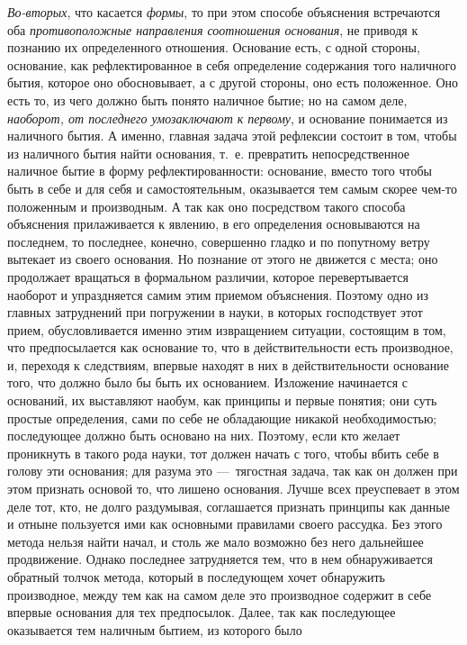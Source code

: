 {\em Во-вторых}, что касается
{\em формы}, то при этом способе объяснения встречаются
оба {\em противоположные направления соотношения
основания}, не приводя к познанию их определенного отношения. Основание
есть, с одной стороны, основание, как рефлектированное в себя определение
содержания того наличного бытия, которое оно обосновывает, а с другой
стороны, оно есть положенное. Оно есть то, из чего должно быть понято
наличное бытие; но на самом деле, {\em наоборот, от
последнего умозаключают к первому}, и основание понимается из наличного
бытия. А именно, главная задача этой рефлексии состоит в том, чтобы из
наличного бытия найти основания, т.~е. превратить непосредственное наличное
бытие в форму рефлектированности: основание, вместо того чтобы быть в себе
и для себя и самостоятельным, оказывается тем самым скорее чем-то
положенным и производным. А так как оно посредством такого способа
объяснения прилаживается к явлению, в его определения основываются на
последнем, то последнее, конечно, совершенно гладко и по попутному ветру
вытекает из своего основания. Но познание от этого не движется с места; оно
продолжает вращаться в формальном различии, которое перевертывается
наоборот и упраздняется самим этим приемом объяснения. Поэтому одно из
главных затруднений при погружении в науки, в которых господствует этот
прием, обусловливается именно этим извращением ситуации, состоящим в том,
что предпосылается как основание то, что в действительности есть
производное, и, переходя к следствиям, впервые находят в них в
действительности основание того, что должно было бы быть их основанием.
Изложение начинается с оснований, их выставляют наобум, как принципы и
первые понятия; они суть простые определения, сами по себе не обладающие
никакой необходимостью; последующее должно быть основано на них. Поэтому,
если кто желает проникнуть в такого рода науки, тот должен начать с того,
чтобы вбить себе в голову эти основания; для разума это —~тягостная задача,
так как он должен при этом признать основой то, что лишено основания. Лучше
всех преуспевает в этом деле тот, кто, не долго раздумывая, соглашается
признать принципы как данные и отныне пользуется ими как основными
правилами своего рассудка. Без этого метода нельзя найти начал, и столь же
мало возможно без него дальнейшее продвижение. Однако последнее
затрудняется тем, что в нем обнаруживается обратный толчок метода, который
в последующем хочет обнаружить производное, между тем как на самом деле это
производное содержит в себе впервые основания для тех предпосылок. Далее,
так как последующее оказывается тем наличным бытием, из которого было
